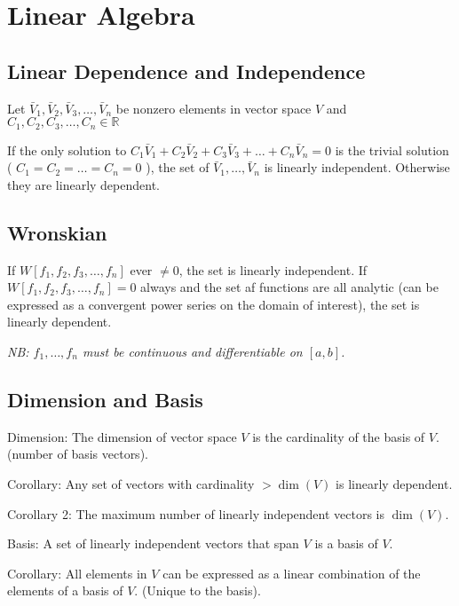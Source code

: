 \documentclass{report}
\begin{document}
\setcounter{chapter}{3}

\chapter{Linear Algebra}

\section{Linear Dependence and Independence}

Let $\bar{V}_1, \bar{V}_2, \bar{V}_3, \ldots, \bar{V}_n$ be nonzero elements in vector space $V$ and $C_1, C_2, C_3, \ldots, C_n \in \mathbb{R}$

If the only solution to $C_1 \bar{V}_1+C_2 \bar{V}_2+C_3 \bar{V}_3+\ldots+ C_n \bar{V}_n=0$ is the trivial solution ( $C_1=C_2=\ldots=C_n=0$ ), the set of $\bar{V}_1, \ldots, \bar{V}_n$ is linearly independent. Otherwise they are linearly dependent.

\section{Wronskian}

If $W\left[f_1, f_2, f_3, \ldots, f_n\right]$ ever $\neq 0$, the set is linearly independent. If $W\left[f_1, f_2, f_3, \ldots, f_n\right]=0$ always and the set af functions are all analytic (can be expressed as a convergent power series on the domain of interest), the set is linearly dependent.

\emph{NB: $f_1, \ldots, f_n$ must be continuous and differentiable on $[a, b]$.}

\section{Dimension and Basis}

Dimension: The dimension of vector space $V$ is the cardinality of the basis of $V$. (number of basis vectors).

Corollary: Any set of vectors with cardinality $>\operatorname{dim}(V)$ is linearly dependent.

Corollary 2: The maximum number of linearly independent vectors is $\operatorname{dim}(V)$.

Basis: A set of linearly independent vectors that span $V$ is a basis of $V$. 

Corollary: All elements in $V$ can be expressed as a linear combination of the elements of a basis of $V$. (Unique to the basis).
\end{document}
